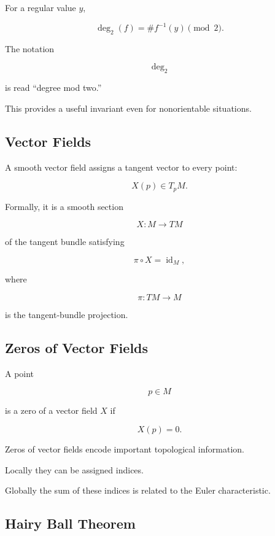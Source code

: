 For a regular value \(y\),

\[
\boxed{
\deg_2(f)
=
\#f^{-1}(y)\pmod 2.
}
\]

The notation

\[
\deg_2
\]

is read ``degree mod two.''

This provides a useful invariant even for nonorientable situations.

\subsection{Vector Fields}
\label{subsec:differential-topology-vector-fields}

A smooth vector field assigns a tangent vector to every point:

\[
\boxed{
X(p)\in T_pM.
}
\]

Formally, it is a smooth section

\[
\boxed{
X:M\to TM
}
\]

of the tangent bundle satisfying

\[
\pi\circ X=\operatorname{id}_M,
\]

where

\[
\pi:TM\to M
\]

is the tangent-bundle projection.

\subsection{Zeros of Vector Fields}
\label{subsec:zeros-vector-fields}

A point

\[
p\in M
\]

is a zero of a vector field \(X\) if

\[
\boxed{
X(p)=0.
}
\]

Zeros of vector fields encode important topological information.

Locally they can be assigned indices.

Globally the sum of these indices is related to the Euler characteristic.

\subsection{Hairy Ball Theorem}
\label{subsec:hairy-ball-theorem}

